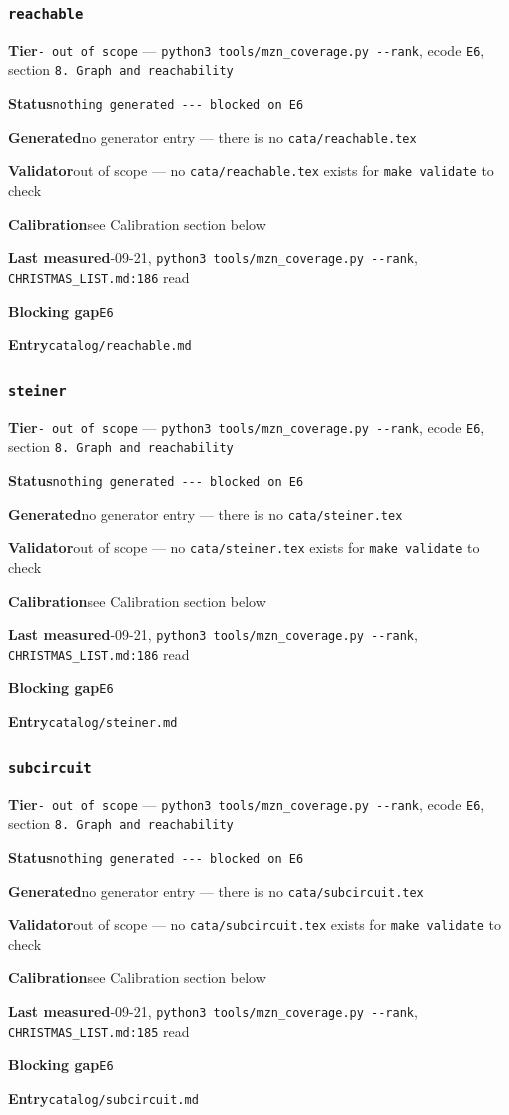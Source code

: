 \documentclass[10pt,a4paper]{article}
\newcommand{\entryfield}[2]{{\raggedright\textbf{#1}\quad #2\par}}
\begin{document}
\subsubsection*{\texttt{reachable}}
\label{entry:reachable}
\entryfield{Tier}{\texttt{- out of scope} --- \texttt{python3 tools/\allowbreak{}mzn\_\allowbreak{}coverage.\allowbreak{}py -\allowbreak{}-\allowbreak{}rank}, ecode \texttt{E6}, section \texttt{8.\allowbreak{} Graph and reachability}}
\entryfield{Status}{\texttt{nothing generated -\allowbreak{}-\allowbreak{}-\allowbreak{} blocked on E6}}
\entryfield{Generated}{no generator entry --- there is no \texttt{cata/reachable.tex}}
\entryfield{Validator}{out of scope --- no \texttt{cata/reachable.tex} exists for \texttt{make validate} to check}
\entryfield{Calibration}{see Calibration section below}
\entryfield{Last measured}{2026-09-21, \texttt{python3 tools/\allowbreak{}mzn\_\allowbreak{}coverage.\allowbreak{}py -\allowbreak{}-\allowbreak{}rank}, \texttt{CHRISTMAS\_LIST.md:186} read}
\entryfield{Blocking gap}{\texttt{E6}}
\entryfield{Entry}{\texttt{catalog/reachable.md}}
\subsubsection*{\texttt{steiner}}
\label{entry:steiner}
\entryfield{Tier}{\texttt{- out of scope} --- \texttt{python3 tools/\allowbreak{}mzn\_\allowbreak{}coverage.\allowbreak{}py -\allowbreak{}-\allowbreak{}rank}, ecode \texttt{E6}, section \texttt{8.\allowbreak{} Graph and reachability}}
\entryfield{Status}{\texttt{nothing generated -\allowbreak{}-\allowbreak{}-\allowbreak{} blocked on E6}}
\entryfield{Generated}{no generator entry --- there is no \texttt{cata/steiner.tex}}
\entryfield{Validator}{out of scope --- no \texttt{cata/steiner.tex} exists for \texttt{make validate} to check}
\entryfield{Calibration}{see Calibration section below}
\entryfield{Last measured}{2026-09-21, \texttt{python3 tools/\allowbreak{}mzn\_\allowbreak{}coverage.\allowbreak{}py -\allowbreak{}-\allowbreak{}rank}, \texttt{CHRISTMAS\_LIST.md:186} read}
\entryfield{Blocking gap}{\texttt{E6}}
\entryfield{Entry}{\texttt{catalog/steiner.md}}
\subsubsection*{\texttt{subcircuit}}
\label{entry:subcircuit}
\entryfield{Tier}{\texttt{- out of scope} --- \texttt{python3 tools/\allowbreak{}mzn\_\allowbreak{}coverage.\allowbreak{}py -\allowbreak{}-\allowbreak{}rank}, ecode \texttt{E6}, section \texttt{8.\allowbreak{} Graph and reachability}}
\entryfield{Status}{\texttt{nothing generated -\allowbreak{}-\allowbreak{}-\allowbreak{} blocked on E6}}
\entryfield{Generated}{no generator entry --- there is no \texttt{cata/subcircuit.tex}}
\entryfield{Validator}{out of scope --- no \texttt{cata/subcircuit.tex} exists for \texttt{make validate} to check}
\entryfield{Calibration}{see Calibration section below}
\entryfield{Last measured}{2026-09-21, \texttt{python3 tools/\allowbreak{}mzn\_\allowbreak{}coverage.\allowbreak{}py -\allowbreak{}-\allowbreak{}rank}, \texttt{CHRISTMAS\_LIST.md:185} read}
\entryfield{Blocking gap}{\texttt{E6}}
\entryfield{Entry}{\texttt{catalog/subcircuit.md}}
\end{document}

